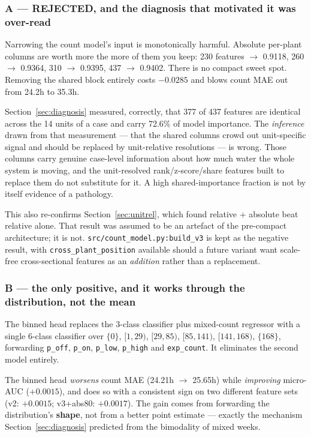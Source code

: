 \subsubsection*{A --- REJECTED, and the diagnosis that motivated it was over-read}

\begin{finding}
Narrowing the count model's input is monotonically harmful. Absolute per-plant columns are worth
more the more of them you keep: 230 features $\to$ 0.9118, 260 $\to$ 0.9364, 310 $\to$ 0.9395,
437 $\to$ 0.9402. There is no compact sweet spot. Removing the shared block entirely costs
$-0.0285$ and blows count MAE out from 24.2h to 35.3h.
\end{finding}

Section~\ref{sec:diagnosis} measured, correctly, that 377 of 437 features are identical across the
14 units of a case and carry 72.6\% of model importance. The \emph{inference} drawn from that
measurement --- that the shared columns crowd out unit-specific signal and should be replaced by
unit-relative resolutions --- is wrong. Those columns carry genuine case-level information about
how much water the whole system is moving, and the unit-resolved rank/z-score/share features
built to replace them do not substitute for it. A high shared-importance fraction is not by
itself evidence of a pathology.

This also re-confirms Section~\ref{sec:unitrel}, which found relative $+$ absolute beat relative
alone. That result was assumed to be an artefact of the pre-compact architecture; it is not.
\texttt{src/count\_model.py:build\_v3} is kept as the negative result, with
\texttt{cross\_plant\_position} available should a future variant want scale-free cross-sectional
features as an \emph{addition} rather than a replacement.

\subsubsection*{B --- the only positive, and it works through the distribution, not the mean}

The binned head replaces the 3-class classifier plus mixed-count regressor with a single 6-class
classifier over $\{0\}$, $[1,29)$, $[29,85)$, $[85,141)$, $[141,168)$, $\{168\}$, forwarding
\texttt{p\_off}, \texttt{p\_on}, \texttt{p\_low}, \texttt{p\_high} and \texttt{exp\_count}.
It eliminates the second model entirely.

\begin{finding}
The binned head \emph{worsens} count MAE (24.21h $\to$ 25.65h) while \emph{improving} micro-AUC
($+0.0015$), and does so with a consistent sign on two different feature sets (v2: $+0.0015$;
v3$+$abs80: $+0.0017$). The gain comes from forwarding the distribution's \textbf{shape}, not
from a better point estimate --- exactly the mechanism Section~\ref{sec:diagnosis} predicted from
the bimodality of mixed weeks.
\end{finding}

